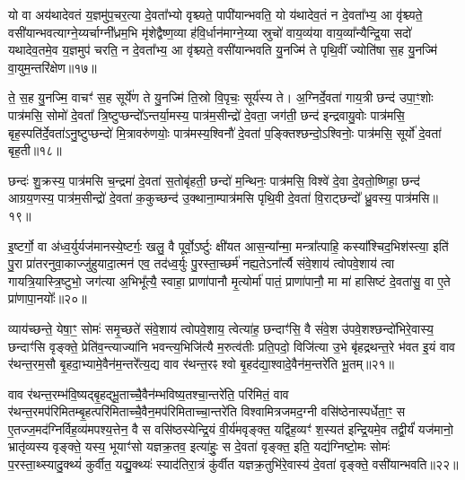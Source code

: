 {\anuvakamend[{व्यावृ॑त्त्या अ॒भितो॑ व॒पां पञ्च॑ च॥५॥}]}

यो वा अय॑थादेवतं य॒ज्ञमु॑प॒चर॒त्या दे॒वता᳚भ्यो वृश्च्यते॒ पापी॑यान्भवति॒ यो य॑थादेव॒तं न दे॒वता᳚भ्य॒ आ वृ॑श्च्यते॒ वसी॑यान्भवत्याग्ने॒य्यर्चाग्नी᳚ध्रम॒भि मृ॑शेद्वैष्ण॒व्या ह॑वि॒र्धान॑माग्ने॒य्या स्रुचो॑ वाय॒व्य॑या वाय॒व्या᳚न्यैन्द्रि॒या सदो॑ यथादेव॒तमे॒व य॒ज्ञमुप॑ चरति॒ न दे॒वता᳚भ्य॒ आ वृ॑श्च्यते॒ वसी॑यान्भवति यु॒नज्मि॑ ते पृथि॒वीं ज्योति॑षा स॒ह यु॒नज्मि॑ वा॒युम॒न्तरि॑क्षेण॥१७॥

ते॒ स॒ह यु॒नज्मि॒ वाचꣳ॑ स॒ह सूर्ये॑ण ते यु॒नज्मि॑ ति॒स्रो वि॒पृचः॒ सूर्य॑स्य ते। अ॒ग्निर्दे॒वता॑ गाय॒त्री छन्द॑ उपा॒ꣳ॒शोः पात्र॑मसि॒ सोमो॑ दे॒वता᳚ त्रि॒ष्टुप्छन्दो᳚\-ऽन्तर्या॒मस्य॒ पात्र॑म॒सीन्द्रो॑ दे॒वता॒ जग॑ती॒ छन्द॑ इन्द्रवायु॒वोः पात्र॑मसि॒ बृह॒स्पति॑र्दे॒वता॑\-ऽनु॒ष्टुप्छन्दो॑ मि॒त्रावरु॑णयोः॒ पात्र॑मस्य॒श्विनौ॑ दे॒वता॑ प॒ङ्क्तिश्छन्दो॒\-ऽश्विनोः॒ पात्र॑मसि॒ सूर्यो॑ दे॒वता॑ बृह॒ती॥१८॥

छन्दः॑ शु॒क्रस्य॒ पात्र॑मसि च॒न्द्रमा॑ दे॒वता॑ स॒तोबृ॑हती॒ छन्दो॑ म॒न्थिनः॒ पात्र॑मसि॒ विश्वे॑ दे॒वा दे॒वतो॒ष्णिहा॒ छन्द॑ आग्रय॒णस्य॒ पात्र॑म॒सीन्द्रो॑ दे॒वता॑ क॒कुच्छन्द॑ उ॒क्थाना॒म्पात्र॑मसि पृथि॒वी दे॒वता॑ वि॒राट्छन्दो᳚ ध्रु॒वस्य॒ पात्र॑मसि॥१९॥

{\anuvakamend[{अ॒न्तरि॑क्षेण बृह॒ती त्रय॑स्त्रिꣳशच्च॥६॥}]}

इ॒ष्टर्गो॒ वा अ॑ध्व॒र्युर्यज॑मानस्ये॒ष्टर्गः॒ खलु॒ वै पूर्वो॒\-ऽर्ष्टुः क्षी॑यत आस॒न्या᳚न्मा॒ मन्त्रा᳚त्पाहि॒ कस्या᳚श्चिद॒भिश॑स्त्या॒ इति॑ पु॒रा प्रा॑तरनुवा॒काज्जु॑हुयादा॒त्मन॑ एव॒ तद॑ध्व॒र्युः पु॒रस्ता॒च्छर्म॑ नह्य॒ते\-ऽना᳚र्त्यै संवे॒शाय॑ त्वोपवे॒शाय॑ त्वा गायत्रि॒यास्त्रि॒ष्टुभो॒ जग॑त्या अ॒भिभू᳚त्यै॒ स्वाहा॒ प्राणा॑पानौ मृ॒त्योर्मा॑ पातं॒ प्राणा॑पानौ॒ मा मा॑ हासिष्टं दे॒वता॑सु॒ वा ए॒ते प्रा॑णापा॒नयोः᳚॥२०॥

व्याय॑च्छन्ते॒ येषा॒ꣳ॒ सोमः॑ समृ॒च्छते॑ संवे॒शाय॑ त्वोपवे॒शाय॒ त्वेत्या॑ह॒ छन्दाꣳ॑सि॒ वै सं॑वे॒श उ॑पवे॒शश्छन्दो॑भिरे॒वास्य॒ छन्दाꣳ॑सि वृङ्क्ते॒ प्रेति॑व॒न्त्याज्या॑नि भवन्त्य॒भिजि॑त्यै म॒रुत्व॑तीः प्रति॒पदो॒ विजि॑त्या उ॒भे बृ॑हद्रथन्त॒रे भ॑वत इ॒यं वाव र॑थन्त॒रम॒सौ बृ॒हदा॒भ्यामे॒वैन॑म॒न्तरे᳚त्य॒द्य वाव र॑थन्त॒रꣴ श्वो बृ॒हद॑द्या॒श्वादे॒वैन॑म॒न्तरे॑ति भू॒तम्॥२१॥

वाव र॑थन्त॒रम्भ॑वि॒ष्यद्बृ॒हद्भू॒ताच्चै॒वैन॑म्भविष्य॒तश्चा॒न्तरे॑ति॒ परि॑मितं॒ वाव र॑थन्त॒रमप॑रिमितम्बृ॒हत्परि॑मिताच्चै॒वैन॒मप॑रि\-मिताच्चा॒न्तरे॑ति विश्वामित्रजमद॒ग्नी वसि॑ष्ठेनास्पर्धेता॒ꣳ॒ स ए॒तज्ज॒मद॑ग्निर्विह॒व्य॑मपश्य॒त्तेन॒ वै स वसि॑ष्ठस्येन्द्रि॒यं वी॒र्य॑मवृङ्क्त॒ यद्वि॑ह॒व्यꣳ॑ श॒स्यत॑ इन्द्रि॒यमे॒व तद्वी॒र्यं॑ यज॑मानो॒ भ्रातृ॑व्यस्य वृङ्क्ते॒ यस्य॒ भूयाꣳ॑सो यज्ञक्र॒तव॒ इत्या॑हुः॒ स दे॒वता॑ वृङ्क्त॒ इति॒ यद्य॑ग्निष्टो॒मः सोमः॑ प॒रस्ता॒थ्स्यादु॒क्थ्यं॑ कुर्वीत॒ यद्यु॒क्थ्यः॑ स्याद॑तिरा॒त्रं कु॑र्वीत यज्ञक्र॒तुभि॑रे॒वास्य॑ दे॒वता॑ वृङ्क्ते॒ वसी॑यान्भवति॥२२॥

